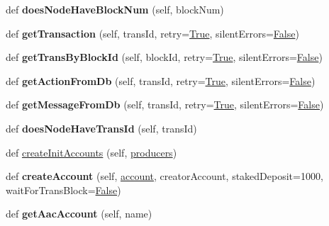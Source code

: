 \begin{DoxyCompactItemize}
def {\bfseries does\+Node\+Have\+Block\+Num} (self, block\+Num)
\item 
\mbox{\label{classtest_utils_1_1_node_a6324f21eb3825bb5d0097ea18953e52c}} 
def {\bfseries get\+Transaction} (self, trans\+Id, retry=\mbox{\hyperlink{struct_true}{True}}, silent\+Errors=\mbox{\hyperlink{struct_false}{False}})
\item 
\mbox{\label{classtest_utils_1_1_node_a436d456548b422fced5cfe3649805714}} 
def {\bfseries get\+Trans\+By\+Block\+Id} (self, block\+Id, retry=\mbox{\hyperlink{struct_true}{True}}, silent\+Errors=\mbox{\hyperlink{struct_false}{False}})
\item 
\mbox{\label{classtest_utils_1_1_node_a0a56c106f6606af4fbe1c35a7d73c653}} 
def {\bfseries get\+Action\+From\+Db} (self, trans\+Id, retry=\mbox{\hyperlink{struct_true}{True}}, silent\+Errors=\mbox{\hyperlink{struct_false}{False}})
\item 
\mbox{\label{classtest_utils_1_1_node_afac9f131494dfcf7ebd11389df7f36ea}} 
def {\bfseries get\+Message\+From\+Db} (self, trans\+Id, retry=\mbox{\hyperlink{struct_true}{True}}, silent\+Errors=\mbox{\hyperlink{struct_false}{False}})
\item 
\mbox{\label{classtest_utils_1_1_node_aee7f5874718f25e4ba827c81b0449d8e}} 
def {\bfseries does\+Node\+Have\+Trans\+Id} (self, trans\+Id)
\item 
def \mbox{\hyperlink{classtest_utils_1_1_node_a45c2532f2f74347271c884c157eace3f}{create\+Init\+Accounts}} (self, \mbox{\hyperlink{structproducers}{producers}})
\item 
\mbox{\label{classtest_utils_1_1_node_a7446aa11ac0a6cc833549f3dfaf85010}} 
def {\bfseries create\+Account} (self, \mbox{\hyperlink{structaccount}{account}}, creator\+Account, staked\+Deposit=1000, wait\+For\+Trans\+Block=\mbox{\hyperlink{struct_false}{False}})
\item 
\mbox{\label{classtest_utils_1_1_node_ad71d345c1facc9ce60c538664bc7b17b}} 
def {\bfseries get\+Aac\+Account} (self, name)
\item 
\mbox{\label{classtest_utils_1_1_node_acefbd61b6865607761d99109b0724222}} 

\end{DoxyCompactItemize}
